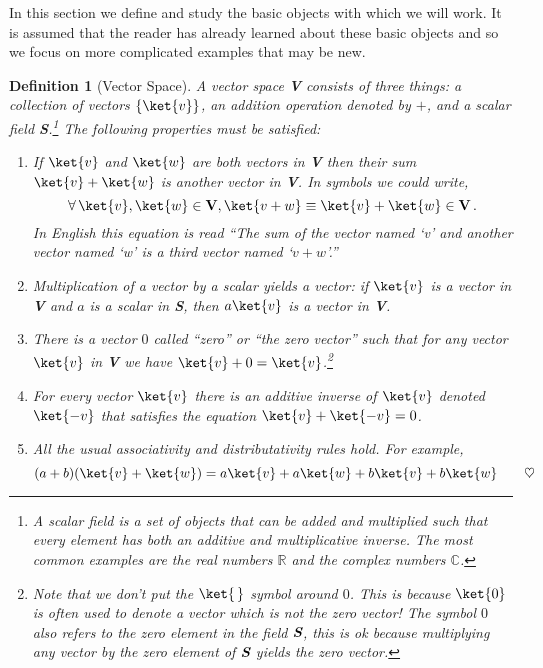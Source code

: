 In this section we define and study the basic objects with which we will work.
It is assumed that the reader has already learned about these basic objects and so we focus on more complicated examples that may be new.


\newtheorem{definition}{Definition}
\begin{definition}[Vector Space]
A vector space \textbf{V} consists of three things: a collection of vectors $\{\ket{v}\}$, an addition operation denoted by $+$, and a scalar field \textit{\textbf{S}}.\footnote{A scalar field is a set of objects that can be added and multiplied such that every element has both an additive and multiplicative inverse.
The most common examples are the real numbers $\mathbb{R}$ and the complex numbers $\mathbb{C}$.}
The following properties must be satisfied:
\begin{enumerate}
\item If $\ket{v}$ and $\ket{w}$ are both vectors in \textbf{V} then their sum $\ket{v} + \ket{w}$ is another vector in \textbf{V}.
In symbols we could write,
\begin{equation*}
\forall \, \ket{v}, \ket{w} \in \textbf{V}, \ket{v+w} \equiv \ket{v} + \ket{w} \in \textbf{V} \, .
\end{equation*}
In English this equation is read ``The sum of the vector named `v' and another vector named `w' is a third vector named `$v+w$'.''

\item Multiplication of a vector by a scalar yields a vector: if $\ket{v}$ is a vector in \textbf{V} and $a$ is a scalar in \textbf{S}, then $a\ket{v}$ is a vector in \textbf{V}.

\item There is a vector $0$ called ``zero'' or ``the zero vector'' such that for any vector $\ket{v}$ in \textbf{V} we have $\ket{v} + 0 = \ket{v}$.\footnote{Note that we don't put the $\ket{\,}$ symbol around $0$.
This is because $\ket{0}$ is often used to denote a vector which is \emph{not the zero vector!}
The symbol $0$ also refers to the zero element in the field $\textit{\textbf{S}}$, this is ok because multiplying any vector by the zero element of $\textit{\textbf{S}}$ yields the zero vector.}

\item For every vector $\ket{v}$ there is an additive inverse of $\ket{v}$ denoted $\ket{-v}$ that satisfies the equation $\ket{v} + \ket{-v} = 0$.

\item All the usual associativity and distributativity rules hold.
For example,
\begin{equation*}
(a+b)(\ket{v} + \ket{w}) = a\ket{v} + a\ket{w} + b\ket{v} + b\ket{w} \qquad \heartsuit
\end{equation*}
\end{enumerate}
\end{definition}

